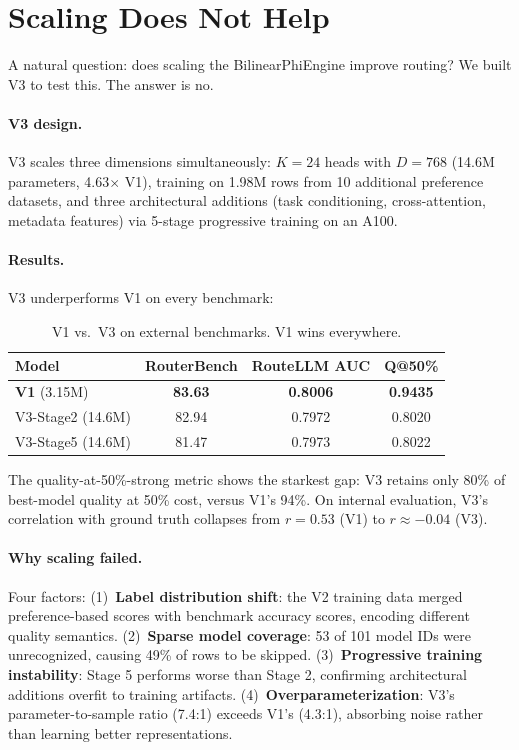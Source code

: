 \section{Scaling Does Not Help}
\label{sec:scaling}

A natural question: does scaling the BilinearPhiEngine improve routing? We built V3 to test this. The answer is no.

\paragraph{V3 design.} V3 scales three dimensions simultaneously: $K=24$ heads with $D=768$ (14.6M parameters, 4.63$\times$ V1), training on 1.98M rows from 10 additional preference datasets, and three architectural additions (task conditioning, cross-attention, metadata features) via 5-stage progressive training on an A100.

\paragraph{Results.} V3 underperforms V1 on every benchmark:

\begin{table}[h]
\centering
\caption{V1 vs.\ V3 on external benchmarks. V1 wins everywhere.}
\label{tab:v3_external}
\small
\begin{tabular}{lccc}
\toprule
\textbf{Model} & \textbf{RouterBench} & \textbf{RouteLLM AUC} & \textbf{Q@50\%} \\
\midrule
\textbf{V1} (3.15M) & \textbf{83.63} & \textbf{0.8006} & \textbf{0.9435} \\
V3-Stage2 (14.6M) & 82.94 & 0.7972 & 0.8020 \\
V3-Stage5 (14.6M) & 81.47 & 0.7973 & 0.8022 \\
\bottomrule
\end{tabular}
\end{table}

The quality-at-50\%-strong metric shows the starkest gap: V3 retains only 80\% of best-model quality at 50\% cost, versus V1's 94\%. On internal evaluation, V3's correlation with ground truth collapses from $r = 0.53$ (V1) to $r \approx -0.04$ (V3).

\paragraph{Why scaling failed.} Four factors: (1)~\textbf{Label distribution shift}: the V2 training data merged preference-based scores with benchmark accuracy scores, encoding different quality semantics. (2)~\textbf{Sparse model coverage}: 53 of 101 model IDs were unrecognized, causing 49\% of rows to be skipped. (3)~\textbf{Progressive training instability}: Stage 5 performs worse than Stage 2, confirming architectural additions overfit to training artifacts. (4)~\textbf{Overparameterization}: V3's parameter-to-sample ratio (7.4:1) exceeds V1's (4.3:1), absorbing noise rather than learning better representations.

